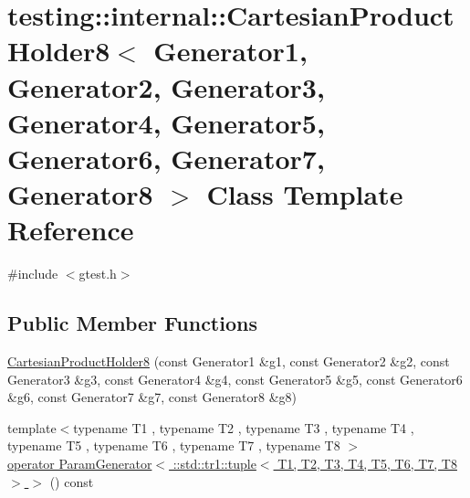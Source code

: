 \hypertarget{classtesting_1_1internal_1_1_cartesian_product_holder8}{\section{testing\-:\-:internal\-:\-:Cartesian\-Product\-Holder8$<$ Generator1, Generator2, Generator3, Generator4, Generator5, Generator6, Generator7, Generator8 $>$ Class Template Reference}
\label{classtesting_1_1internal_1_1_cartesian_product_holder8}
}


{\ttfamily \#include $<$gtest.\-h$>$}

\subsection*{Public Member Functions}
\begin{DoxyCompactItemize}
\item 
\hyperlink{classtesting_1_1internal_1_1_cartesian_product_holder8_adacdd7a2e15963d1b2f559d65f6b2aac}{Cartesian\-Product\-Holder8} (const Generator1 \&g1, const Generator2 \&g2, const Generator3 \&g3, const Generator4 \&g4, const Generator5 \&g5, const Generator6 \&g6, const Generator7 \&g7, const Generator8 \&g8)
\item 
{\footnotesize template$<$typename T1 , typename T2 , typename T3 , typename T4 , typename T5 , typename T6 , typename T7 , typename T8 $>$ }\\\hyperlink{classtesting_1_1internal_1_1_cartesian_product_holder8_a0cebd8cc28ade7d82c4d6b5f7ce9ee86}{operator Param\-Generator$<$ \-::std\-::tr1\-::tuple$<$ T1, T2, T3, T4, T5, T6, T7, T8 $>$ $>$} () const 
\end{DoxyCompactItemize}


